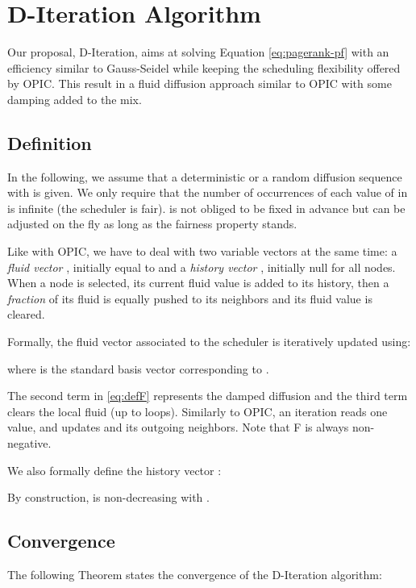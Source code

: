 \documentclass{llncs}
\begin{document}
\section{D-Iteration Algorithm}\label{sec:d-iteration-algorithm}


Our proposal, D-Iteration, aims at solving Equation \eqref{eq:pagerank-pf} with an efficiency similar to Gauss-Seidel while keeping the scheduling flexibility offered by OPIC. This result in a fluid diffusion approach similar to OPIC with some damping added to the mix.

\subsection{Definition}

In the following, we assume that a deterministic or a random diffusion sequence  with  is given. We only require that the number of occurrences of each value of  in  is infinite (the scheduler  is fair).  is not obliged to be fixed in advance but can be adjusted on the fly as long as the fairness property stands.





Like with OPIC, we have to deal with two variable vectors at the same time: a \emph{fluid vector} , initially equal to  and a \emph{history vector} , initially null for all nodes.
When a node is selected, its current fluid value is added to its history, then a \emph{fraction } of its fluid is equally pushed to its neighbors and its fluid value is cleared.

Formally, the fluid vector  associated to the scheduler  is iteratively updated using:


where  is the standard basis vector corresponding to .

The second term in \eqref{eq:defF} represents the damped diffusion and the third term clears the local fluid (up to loops). Similarly to OPIC, an iteration reads one value,  and updates  and its outgoing neighbors. Note that F is always non-negative.

We also formally define the history vector :


By construction,  is non-decreasing with .

\subsection{Convergence}

The following Theorem states the convergence of the D-Iteration algorithm:
\end{document}
